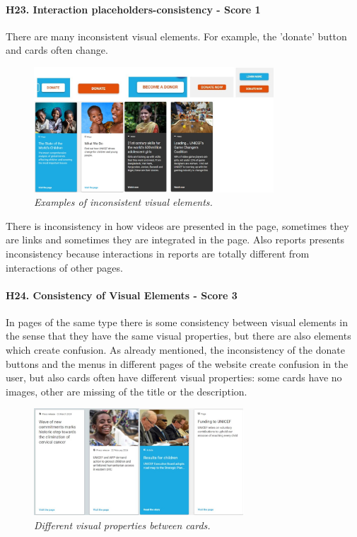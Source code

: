 \newline \paragraph{H23. Interaction placeholders-consistency - Score 1}  \label{subsec:H23}	There are many inconsistent visual elements. For example, the 'donate' button and cards often change.
\begin{figure}[!h]
	\begin{center}
		\includegraphics[width=0.8\textwidth]{FinalScores27.jpg}
		\captionsetup{font=small}
		\caption{\textit{Examples of inconsistent visual elements.}}
	\end{center}
\end{figure}
\newline There is inconsistency in how videos are presented in the page, sometimes they are links and sometimes they are integrated in the page.
\newline Also reports presents inconsistency because interactions in reports are totally different from interactions of other pages.
\newline
\newline \paragraph{H24. Consistency of Visual Elements - Score 3}  \label{subsec:H24}	In pages of the same type there is some consistency between visual elements in the sense that they have the same visual properties, but there are also elements which create confusion.
\newline As already mentioned, the inconsistency of the donate buttons and the menus in different pages of the website create confusion in the user, but also cards often have different visual properties: some cards have no images, other are missing of the title or the description.
\begin{figure}[!h]
	\begin{center}
		\includegraphics[width=0.7\textwidth]{FinalScores28.jpg}
		\captionsetup{font=small}
		\caption{\textit{Different visual properties between cards.}}
	\end{center}
\end{figure}

